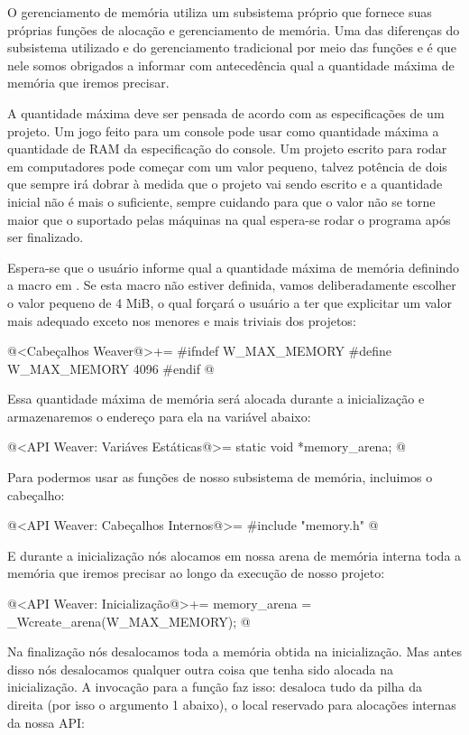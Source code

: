 
O gerenciamento de memória utiliza um subsistema próprio que fornece
suas próprias funções de alocação e gerenciamento de memória. Uma das
diferenças do subsistema utilizado e do gerenciamento tradicional por
meio das funções  e  é que nele
somos obrigados a informar com antecedência qual a quantidade máxima
de memória que iremos precisar.

A quantidade máxima deve ser pensada de acordo com as especificações
de um projeto. Um jogo feito para um console pode usar como quantidade
máxima a quantidade de RAM da especificação do console. Um projeto
escrito para rodar em computadores pode começar com um valor pequeno,
talvez potência de dois que sempre irá dobrar à medida que o projeto
vai sendo escrito e a quantidade inicial não é mais o suficiente,
sempre cuidando para que o valor não se torne maior que o suportado
pelas máquinas na qual espera-se rodar o programa após ser finalizado.

Espera-se que o usuário informe qual a quantidade máxima de memória
definindo a macro 
em . Se esta macro não estiver definida, vamos
deliberadamente escolher o valor pequeno de 4 MiB, o qual forçará o
usuário a ter que explicitar um valor mais adequado exceto nos
menores e mais triviais dos projetos:

\iniciocodigo
@<Cabeçalhos Weaver@>+=
#ifndef W_MAX_MEMORY
#define W_MAX_MEMORY 4096
#endif
@
\fimcodigo

Essa quantidade máxima de memória será alocada durante a inicialização
e armazenaremos o endereço para ela na variável abaixo:

\iniciocodigo
@<API Weaver: Variáves Estáticas@>=
static void *memory_arena;
@
\fimcodigo

Para podermos usar as funções de nosso subsistema de memória,
incluimos o cabeçalho:

\iniciocodigo
@<API Weaver: Cabeçalhos Internos@>=
#include "memory.h"
@
\fimcodigo

E durante a inicialização nós alocamos em nossa arena de memória
interna toda a memória que iremos precisar ao longo da execução de
nosso projeto:

\iniciocodigo
@<API Weaver: Inicialização@>+=
memory_arena = _Wcreate_arena(W_MAX_MEMORY);
@
\fimcodigo

Na finalização nós desalocamos toda a memória obtida na
inicialização. Mas antes disso nós desalocamos qualquer outra coisa
que tenha sido alocada na inicialização. A invocação para a
função  faz isso: desaloca tudo da pilha da
direita (por isso o argumento 1 abaixo), o local reservado para
alocações internas da nossa API:

